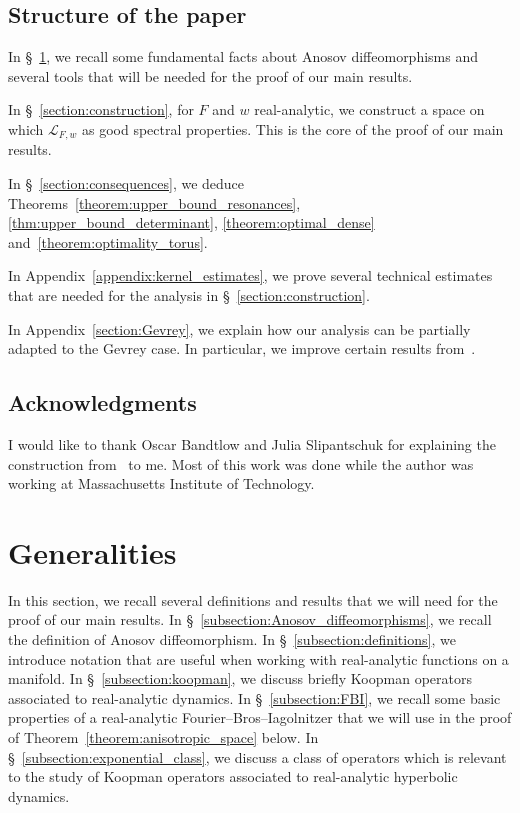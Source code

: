 \documentclass[10pt]{amsart}
\theoremstyle{definition}\newtheorem{defi}[theo]{Definition}\newtheorem{rema}[theo]{Remark}\newtheorem{exam}[theo]{Example}\newtheorem{exem}[theo]{Example}\newtheorem{nota}[theo]{Notation}
\newcommand{\clL}{\mathcal{L}}
\begin{document}
\subsection{Structure of the paper}

In \S~\ref{section:generalities}, we recall some fundamental facts about Anosov diffeomorphisms and several tools that will be needed for the proof of our main results.

In \S~\ref{section:construction}, for $F$ and $w$ real-analytic, we construct a space on which $\clL_{F,w}$ as good spectral properties. This is the core of the proof of our main results.

In \S~\ref{section:consequences}, we deduce Theorems~\ref{theorem:upper_bound_resonances}, \ref{thm:upper_bound_determinant}, \ref{theorem:optimal_dense} and~\ref{theorem:optimality_torus}.

In Appendix~\ref{appendix:kernel_estimates}, we prove several technical estimates that are needed for the analysis in \S~\ref{section:construction}.

In Appendix~\ref{section:Gevrey}, we explain how our analysis can be partially adapted to the Gevrey case. In particular, we improve certain results from~\cite{local_and_global}.

\subsection*{Acknowledgments}

I would like to thank Oscar Bandtlow and Julia Slipantschuk for explaining the construction from~\cite{optimal_examples} to me. Most of this work was done while the author was working at Massachusetts Institute of Technology.

\section{Generalities}\label{section:generalities}

In this section, we recall several definitions and results that we will need for the proof of our main results. In \S~\ref{subsection:Anosov_diffeomorphisms}, we recall the definition of Anosov diffeomorphism. In \S~\ref{subsection:definitions}, we introduce notation that are useful when working with real-analytic functions on a manifold. In \S~\ref{subsection:koopman}, we discuss briefly Koopman operators associated to real-analytic dynamics. In \S~\ref{subsection:FBI}, we recall some basic properties of a real-analytic Fourier--Bros--Iagolnitzer that we will use in the proof of Theorem~\ref{theorem:anisotropic_space} below. In \S~\ref{subsection:exponential_class}, we discuss a class of operators which is relevant to the study of Koopman operators associated to real-analytic hyperbolic dynamics.
\end{document}
